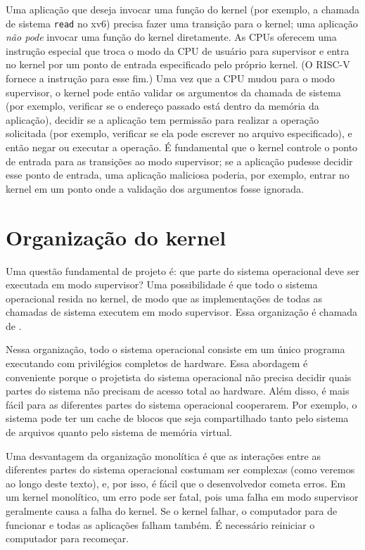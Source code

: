 Uma aplicação que deseja invocar uma função do kernel (por exemplo, a
chamada de sistema \lstinline{read} no xv6) precisa
fazer uma transição para o kernel; uma aplicação \emph{não pode} invocar
uma função do kernel diretamente. As CPUs oferecem uma instrução especial que troca
o modo da CPU de usuário para supervisor e entra no kernel por um ponto de entrada
especificado pelo próprio kernel. (O RISC-V
fornece a instrução
para esse fim.) Uma vez que a CPU mudou para o modo supervisor,
o kernel pode então validar os argumentos da chamada de sistema (por exemplo,
verificar se o endereço passado está dentro da memória da aplicação), decidir se
a aplicação tem permissão para realizar a operação solicitada (por exemplo,
verificar se ela pode escrever no arquivo especificado), e então negar
ou executar a operação. É fundamental que o kernel controle o ponto de entrada para
as transições ao modo supervisor; se a aplicação pudesse decidir esse ponto de entrada,
uma aplicação maliciosa poderia, por exemplo, entrar no kernel em um ponto onde a
validação dos argumentos fosse ignorada.

\section{Organização do kernel}

Uma questão fundamental de projeto é: que parte do sistema
operacional deve ser executada em modo supervisor?
Uma possibilidade é que todo o sistema operacional resida
no kernel, de modo que as implementações de todas as chamadas de sistema
executem em modo supervisor.
Essa organização é chamada de
.

Nessa organização, todo o sistema operacional consiste em um único
programa executando com privilégios completos de hardware.
Essa abordagem é conveniente porque o projetista do sistema operacional não precisa
decidir quais partes do sistema não precisam de acesso total ao hardware.
Além disso, é mais fácil para as diferentes partes do sistema operacional
cooperarem. Por exemplo, o sistema pode ter um cache de blocos que seja
compartilhado tanto pelo sistema de arquivos quanto pelo sistema de memória virtual.

Uma desvantagem da organização monolítica é que as interações entre
as diferentes partes do sistema operacional costumam ser complexas (como veremos
ao longo deste texto), e, por isso, é fácil que o desenvolvedor cometa erros.
Em um kernel monolítico, um erro pode ser fatal, pois uma falha em modo supervisor
geralmente causa a falha do kernel. Se o kernel falhar,
o computador para de funcionar e todas as aplicações falham também.
É necessário reiniciar o computador para recomeçar.

